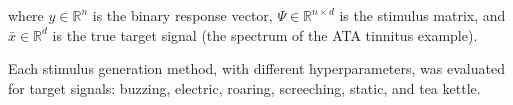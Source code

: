 \documentclass[journal]{IEEEtran}
\begin{document}
where $y \in \mathbb{R}^n$ is the binary response vector,
$\Psi \in \mathbb{R}^{n \times d}$ is the stimulus matrix,
and $\bar{x} \in \mathbb{R}^d$ is the true target signal (the spectrum of the ATA tinnitus example).

Each stimulus generation method, with different hyperparameters,
was evaluated for target signals: buzzing, electric, roaring, screeching, static, and tea kettle.

\begin{table}[ht]
	\begin{center}	
		\small
	\end{center}
\end{table}






\end{document}
